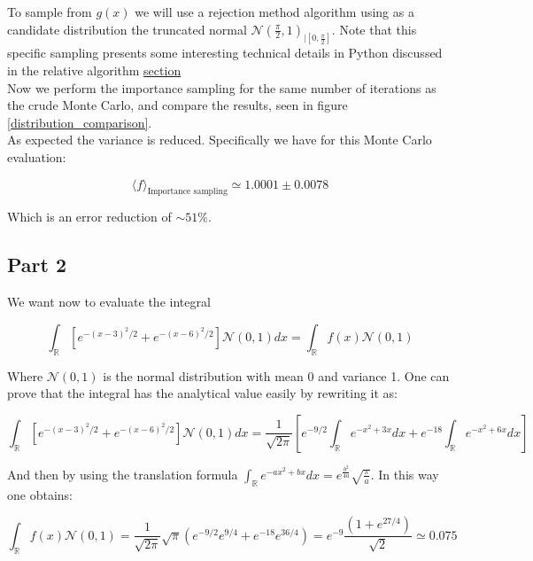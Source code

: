 To sample from $g(x)$ we will use a rejection method algorithm using as a candidate distribution the truncated normal $\mathcal{N}(\frac{\pi}{2}, 1)_{\mid [0, \frac{\pi}{2}]}$. 
Note that this specific sampling presents some interesting technical details in Python discussed in the relative algorithm \hyperref[par:detail_rejection]{section} \\
Now we perform the importance sampling for the same number of iterations as the crude Monte Carlo, and compare the results, seen in figure \ref{distribution_comparison}. \\
As expected the variance is reduced. Specifically we have for this Monte Carlo evaluation:

$$ \langle f \rangle_{\text{Importance sampling}} \simeq 1.0001 \pm 0.0078 $$

Which is an error reduction of $\sim 51 \%$.

\subsection*{Part 2} We want now to evaluate the integral


$$\int_{\mathbb{R}}\left[ e^{-(x-3)^2/2}+e^{-(x-6)^2/2} \right] \mathcal{N}(0,1) dx = \int_{\mathbb{R}} f(x) \mathcal{N}(0,1) $$

Where $\mathcal{N}(0,1)$ is the normal distribution with mean 0 and variance 1.
One can prove that the integral has the analytical value easily by rewriting it as:

$$ \int_{\mathbb{R}}\left[ e^{-(x-3)^2/2}+e^{-(x-6)^2/2} \right] \mathcal{N}(0,1) dx = \frac{1}{\sqrt{2\pi}} \left[ e^{-9/2}\int_{\mathbb{R}}e^{-x^2+3x} dx + e^{-18}\int_{\mathbb{R}}e^{-x^2+6x} dx \right] $$

And then by using the translation formula $\int_{\mathbb{R}} e^{-ax^2+bx} dx = e^{\frac{b^2}{4a}} \sqrt{\frac{\pi}{a}}$. In this way one obtains:

$$ \int_{\mathbb{R}} f(x) \mathcal{N}(0,1) = \frac{1}{\sqrt{2 \pi }} \sqrt{\pi} \left( e^{-9/2}e^{9/4} + e^{-18}e^{36/4}  \right) = e^{-9}\frac{(1 + e^{27/4})}{\sqrt{2}} \simeq 0.075$$

